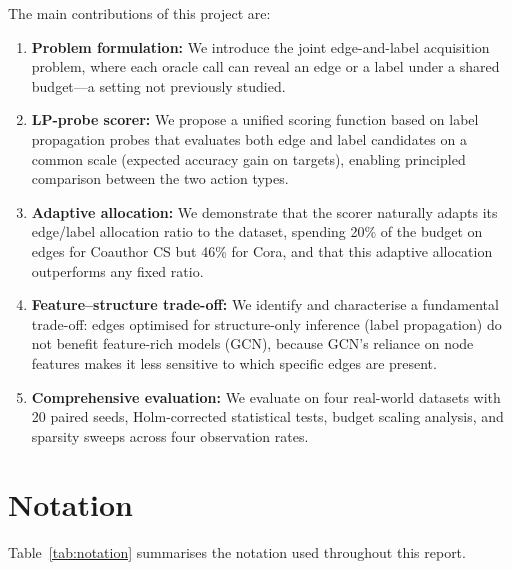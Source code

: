 \documentclass[12pt,a4paper,oneside]{report}
\begin{document}
The main contributions of this project are:
\begin{enumerate}[leftmargin=2em]
    \item \textbf{Problem formulation:} We introduce the joint edge-and-label acquisition problem, where each oracle call can reveal an edge or a label under a shared budget---a setting not previously studied.

    \item \textbf{LP-probe scorer:} We propose a unified scoring function based on label propagation probes that evaluates both edge and label candidates on a common scale (expected accuracy gain on targets), enabling principled comparison between the two action types.

    \item \textbf{Adaptive allocation:} We demonstrate that the scorer naturally adapts its edge/label allocation ratio to the dataset, spending 20\% of the budget on edges for Coauthor CS but 46\% for Cora, and that this adaptive allocation outperforms any fixed ratio.

    \item \textbf{Feature--structure trade-off:} We identify and characterise a fundamental trade-off: edges optimised for structure-only inference (label propagation) do not benefit feature-rich models (GCN), because GCN's reliance on node features makes it less sensitive to which specific edges are present.

    \item \textbf{Comprehensive evaluation:} We evaluate on four real-world datasets with 20 paired seeds, Holm-corrected statistical tests, budget scaling analysis, and sparsity sweeps across four observation rates.
\end{enumerate}

\section{Notation}

Table~\ref{tab:notation} summarises the notation used throughout this report.
\end{document}
